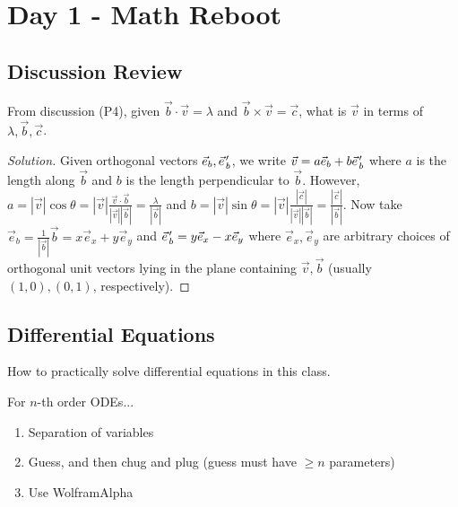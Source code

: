 \section{Day 1 - Math Reboot}

\subsection{Discussion Review}

\begin{prb}
From discussion (P4), given $\vec{b} \cdot \vec{v} = \lambda$ and $\vec{b}
\times \vec{v} = \vec{c}$, what is $\vec{v}$ in terms of $\lambda,
\vec{b}, \vec{c}$.
\end{prb}

\begin{proof}[Solution]
Given orthogonal vectors $\vec{e}_b, \pvec{e}_b'$, we write $\vec{v} = a
\vec{e}_b + b \pvec{e}_b'$ where $a$ is the length along $\vec{b}$ and
$b$ is the length perpendicular to $\vec{b}$. However, $a = |\vec{v}|
\cos \theta = |\vec{v}| \frac{\vec{v} \cdot \vec{b}}{|\vec{v}|
|\vec{b}|} = \frac{\lambda}{|\vec{b}|}$ and $b = |\vec{v}| \sin \theta =
|\vec{v}| \frac{|\vec{c}|}{|\vec{v}| |\vec{b}|} =
\frac{|\vec{c}|}{|\vec{b}|}$. Now take $\vec{e}_b = \frac{1}{|\vec{b}|}
\vec{b} = x \vec{e}_x + y \vec{e}_y$ and $\pvec{e}_b' = y \vec{e}_x - x
\vec{e}_y$ where $\vec{e}_x, \vec{e}_y$ are arbitrary choices of
orthogonal unit vectors lying in the plane containing $\vec{v}, \vec{b}$
(usually $(1, 0), (0, 1)$, respectively).
\end{proof}

\subsection{Differential Equations}

How to practically solve differential equations in this class.

For $n$-th order ODEs...
\begin{enumerate}
\item Separation of variables
\item Guess, and then chug and plug (guess must have $\geq n$
parameters)
\item Use Wolfram{\textbar}Alpha
\end{enumerate}

